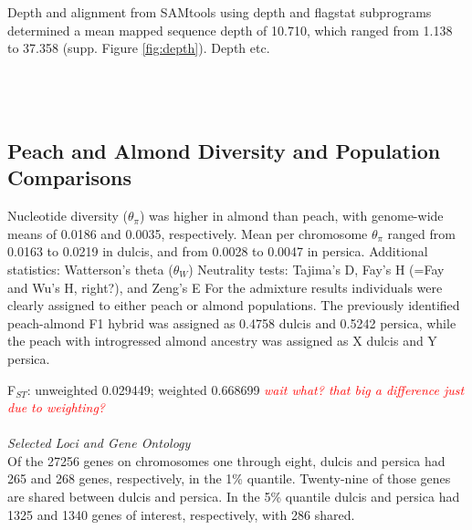 \documentclass[12pt]{article}
\newcommand{\jri}[1]{\textcolor{red}{ \emph{ #1}} }
\begin{document}
Depth and alignment from SAMtools using depth and flagstat subprograms \citep{li2009sequence} determined a mean mapped sequence depth of 10.710, which ranged from 1.138 to 37.358 (supp. Figure \ref{fig:depth}).
%
%
Depth etc.\\
%
\\
\\
%
\\
\subsection*{Peach and Almond Diversity and Population Comparisons}

Nucleotide diversity ($\theta_{\pi}$) was higher in almond than peach, with genome-wide means of 0.0186 and 0.0035, respectively. 
%
Mean per chromosome $\theta_{\pi}$ ranged from 0.0163 to 0.0219 in dulcis, and from 0.0028 to 0.0047 in persica.
Additional statistics: Watterson's theta ($\theta_{W}$)
Neutrality tests: Tajima's D, Fay's H (=Fay and Wu's H, right?), and Zeng's E
For the admixture results individuals were clearly assigned to either peach or almond populations. 
%
The previously identified peach-almond F1 hybrid was assigned as 0.4758 dulcis and 0.5242 persica, while the peach with introgressed almond ancestry was assigned as X dulcis and Y persica.
%

F$_{ST}$: unweighted 0.029449; weighted 0.668699 \jri{wait what? that big a difference just due to weighting?}
\\
%
\\
\emph{Selected Loci and Gene Ontology}\\
Of the 27256 genes on chromosomes one through eight, dulcis and persica had 265 and 268 genes, respectively, in the 1\% quantile. 
%
Twenty-nine of those genes are shared between dulcis and persica.
%
In the 5\% quantile dulcis and persica had 1325 and 1340 genes of interest, respectively, with 286 shared.
\\
\end{document}
